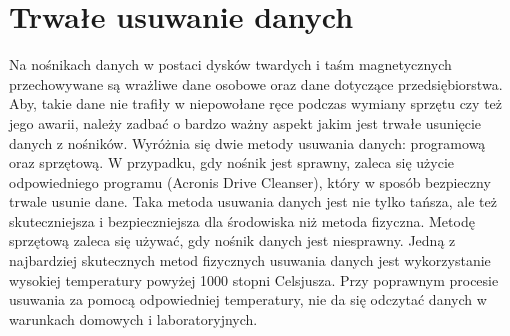 \section{Trwałe usuwanie danych}
Na nośnikach danych w postaci dysków twardych i taśm magnetycznych przechowywane są wrażliwe dane osobowe oraz dane dotyczące przedsiębiorstwa. Aby, takie dane nie trafiły w niepowołane ręce podczas wymiany sprzętu czy też jego awarii, należy zadbać o bardzo ważny aspekt jakim jest trwałe usunięcie danych z nośników. Wyróżnia się dwie metody usuwania danych: programową oraz sprzętową. W przypadku, gdy nośnik jest sprawny, zaleca się użycie odpowiedniego programu (Acronis Drive Cleanser), który w sposób bezpieczny trwale usunie dane. Taka metoda usuwania danych jest nie tylko tańsza, ale też skuteczniejsza i bezpieczniejsza dla środowiska niż metoda fizyczna. Metodę sprzętową zaleca się używać, gdy nośnik danych jest niesprawny. Jedną z najbardziej skutecznych metod fizycznych usuwania danych jest wykorzystanie wysokiej temperatury powyżej 1000 stopni Celsjusza. Przy poprawnym procesie usuwania za pomocą odpowiedniej temperatury, nie da się odczytać danych w warunkach domowych i laboratoryjnych.
